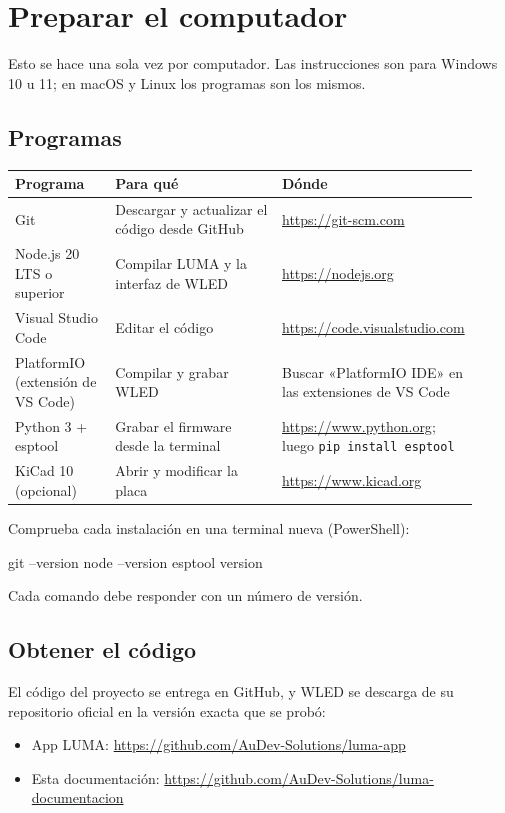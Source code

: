 \chapter{Preparar el computador}\label{cap:pc}

Esto se hace una sola vez por computador. Las instrucciones son para Windows 10 u 11; en macOS y Linux los programas son los mismos.

\section{Programas}

\begin{longtable}{@{}>{\raggedright\arraybackslash}p{0.22\linewidth} >{\raggedright\arraybackslash}p{0.38\linewidth} >{\raggedright\arraybackslash}p{0.32\linewidth}@{}}
\toprule
\textbf{Programa} & \textbf{Para qué} & \textbf{Dónde} \\ \midrule \endhead
Git & Descargar y actualizar el código desde GitHub & \url{https://git-scm.com} \\
Node.js 20 LTS o superior & Compilar LUMA y la interfaz de WLED & \url{https://nodejs.org} \\
Visual Studio Code & Editar el código & \url{https://code.visualstudio.com} \\
PlatformIO (extensión de VS Code) & Compilar y grabar WLED & Buscar «PlatformIO IDE» en las extensiones de VS Code \\
Python 3 + esptool & Grabar el firmware desde la terminal & \url{https://www.python.org}; luego \texttt{pip install esptool} \\
KiCad 10 (opcional) & Abrir y modificar la placa & \url{https://www.kicad.org} \\
\bottomrule
\end{longtable}

Comprueba cada instalación en una terminal nueva (PowerShell):
\begin{comando}
git --version
node --version
esptool version
\end{comando}
Cada comando debe responder con un número de versión.

\section{Obtener el código}

El código del proyecto se entrega en GitHub, y WLED se descarga de su repositorio oficial en la versión exacta que se probó:
\begin{itemize}
\item App LUMA: \url{https://github.com/AuDev-Solutions/luma-app}
\item Esta documentación: \url{https://github.com/AuDev-Solutions/luma-documentacion}
\end{itemize}

